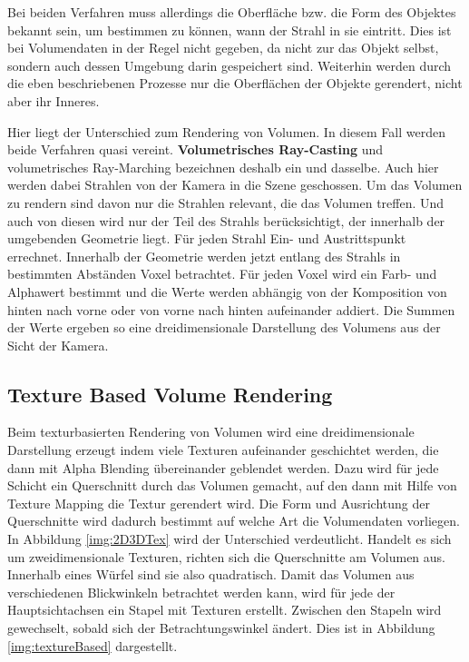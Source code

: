 Bei beiden Verfahren muss allerdings die Oberfläche bzw. die Form des Objektes bekannt sein, um bestimmen zu können, wann der Strahl in sie eintritt. Dies ist bei Volumendaten in der Regel nicht gegeben, da nicht zur das Objekt selbst, sondern auch dessen Umgebung darin gespeichert sind. Weiterhin werden durch die eben beschriebenen Prozesse nur die Oberflächen der Objekte gerendert, nicht aber ihr Inneres.

Hier liegt der Unterschied zum Rendering von Volumen. In diesem Fall werden beide Verfahren quasi vereint. \textbf{Volumetrisches Ray-Casting} und volumetrisches Ray-Marching bezeichnen deshalb ein und dasselbe. Auch hier werden dabei Strahlen von der Kamera in die Szene geschossen. Um das Volumen zu rendern sind davon nur die Strahlen relevant, die das Volumen treffen. Und auch von diesen wird nur der Teil des Strahls berücksichtigt, der innerhalb der umgebenden Geometrie liegt. Für jeden Strahl Ein- und Austrittspunkt errechnet. Innerhalb der Geometrie werden jetzt entlang des Strahls in bestimmten Abständen Voxel betrachtet. Für jeden Voxel wird ein Farb- und Alphawert bestimmt und die Werte werden abhängig von der Komposition von hinten nach vorne oder von vorne nach hinten aufeinander addiert. Die Summen der Werte ergeben so eine dreidimensionale Darstellung des Volumens aus der Sicht der Kamera.

\subsection{Texture Based Volume Rendering}

Beim texturbasierten Rendering von Volumen wird eine dreidimensionale Darstellung erzeugt indem viele Texturen aufeinander geschichtet werden, die dann mit Alpha Blending übereinander geblendet werden. Dazu wird für jede Schicht ein Querschnitt durch das Volumen gemacht, auf den dann mit Hilfe von Texture Mapping die Textur gerendert wird.
Die Form und Ausrichtung der Querschnitte wird dadurch bestimmt auf welche Art die Volumendaten vorliegen. In Abbildung \ref{img:2D3DTex} wird der Unterschied verdeutlicht. Handelt es sich um zweidimensionale Texturen,  richten sich die Querschnitte am Volumen aus. Innerhalb eines Würfel sind sie also quadratisch. Damit das Volumen aus verschiedenen Blickwinkeln betrachtet werden kann, wird für jede der Hauptsichtachsen ein Stapel mit Texturen erstellt. Zwischen den Stapeln wird gewechselt, sobald sich der Betrachtungswinkel ändert. Dies ist in Abbildung \ref{img:textureBased} dargestellt.

